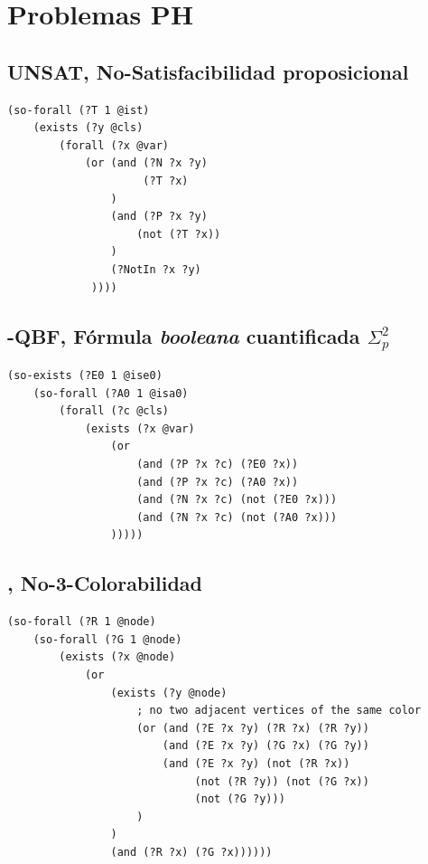 \section{Problemas PH}

\subsection{UNSAT, No-Satisfacibilidad proposicional}
\begin{verbatim}
(so-forall (?T 1 @ist)
    (exists (?y @cls)
        (forall (?x @var)
            (or (and (?N ?x ?y)
                     (?T ?x)
                )
                (and (?P ?x ?y)
                    (not (?T ?x))
                )
                (?NotIn ?x ?y)
             ))))
\end{verbatim}

\subsection{\qEA-QBF, Fórmula \textit{booleana} cuantificada $\Sigma_p^2$}
\begin{verbatim}
(so-exists (?E0 1 @ise0)
    (so-forall (?A0 1 @isa0)
        (forall (?c @cls)
            (exists (?x @var)
                (or
                    (and (?P ?x ?c) (?E0 ?x))
                    (and (?P ?x ?c) (?A0 ?x))
                    (and (?N ?x ?c) (not (?E0 ?x)))
                    (and (?N ?x ?c) (not (?A0 ?x)))
                )))))
\end{verbatim}

\subsection{\coCOL, No-3-Colorabilidad}

\begin{verbatim}
(so-forall (?R 1 @node)
    (so-forall (?G 1 @node)
        (exists (?x @node)
            (or 
                (exists (?y @node)
                    ; no two adjacent vertices of the same color
                    (or (and (?E ?x ?y) (?R ?x) (?R ?y))
                        (and (?E ?x ?y) (?G ?x) (?G ?y))
                        (and (?E ?x ?y) (not (?R ?x)) 
                             (not (?R ?y)) (not (?G ?x)) 
                             (not (?G ?y)))
                    )
                )
                (and (?R ?x) (?G ?x))))))
\end{verbatim}
